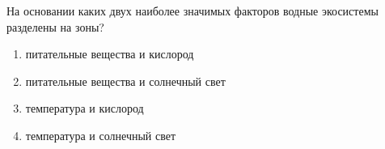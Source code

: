
На основании каких двух наиболее значимых
факторов водные экосистемы разделены на зоны?

\begin{enumerate}
    \item питательные вещества и кислород 
    \item питательные вещества и солнечный свет
    \item температура и кислород 
    \item температура и солнечный свет
\end{enumerate}



